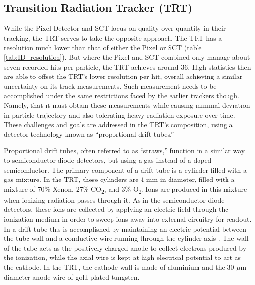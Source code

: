    \subsection{Transition Radiation Tracker (TRT)}

            While the Pixel Detector and SCT focus on quality over quantity in their tracking, the TRT serves to take the opposite approach.
            The TRT has a resolution much lower than that of either the Pixel or SCT (table \ref{tab:ID_resolution}).
            But where the Pixel and SCT combined only manage about seven recorded hits per particle, the TRT achieves around 36.
            High statistics then are able to offset the TRT's lower resolution per hit, overall achieving a similar uncertainty on its track measurements.
            Such measurement needs to be accomplished under the same restrictions faced by the earlier trackers though.
            Namely, that it must obtain these measurements while causing minimal deviation in particle trajectory and also tolerating heavy radiation exposure over time.
            These challenges and goals are addressed in the TRT's composition, using a detector technology known as ``proportional drift tubes.''

            Proportional drift tubes, often referred to as ``straws,'' function in a similar way to semiconductor diode detectors, but using a gas instead of a doped semiconductor.
            The primary component of a drift tube is a cylinder filled with a gas mixture.
            In the TRT, these cylinders are 4 mm in diameter, filled with a mixture of 70\% Xenon, 27\% CO\textsubscript{2}, and 3\% O\textsubscript{2}.
            Ions are produced in this mixture when ionizing radiation passes through it.
            As in the semiconductor diode detectors, these ions are collected by applying an electric field through the ionization medium in order to sweep ions away into external circuitry for readout.
            In a drift tube this is accomplished by maintaining an electric potential between the tube wall and a conductive wire running through the cylinder axis \cite{drift_chambers}.
            The wall of the tube acts as the positively charged anode to collect electrons produced by the ionization, while the axial wire is kept at high electrical potential to act as the cathode.
            In the TRT, the cathode wall is made of aluminium and the 30 $\mu$m diameter anode wire of gold-plated tungsten. \cite{trt_design}

